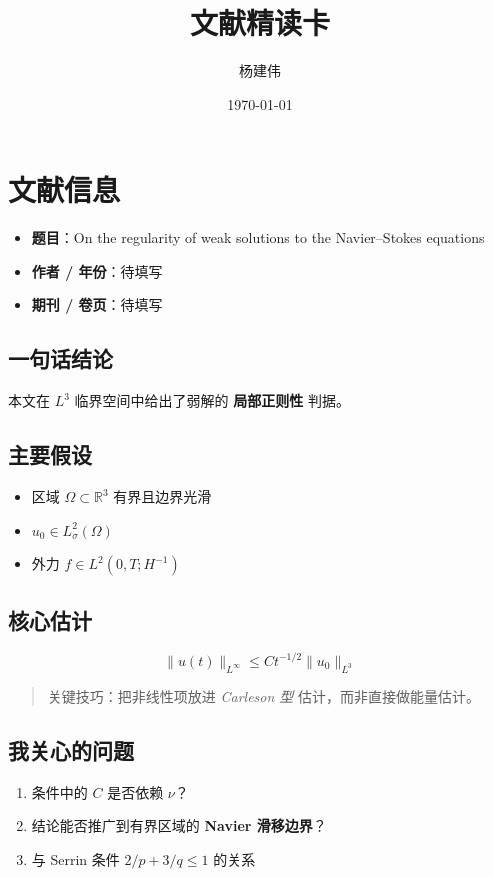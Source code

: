 \documentclass[UTF8,a4paper,11pt,fontset=fandol]{ctexart}
\title{文献精读卡}
\author{杨建伟}
\date{\today}
\begin{document}
\maketitle

\section{文献信息}

\begin{itemize}
  \item \textbf{题目}：On the regularity of weak solutions to the Navier--Stokes equations
  \item \textbf{作者 / 年份}：待填写
  \item \textbf{期刊 / 卷页}：待填写
\end{itemize}

\subsection{一句话结论}

本文在 $L^3$ 临界空间中给出了弱解的 \textbf{局部正则性} 判据。

\subsection{主要假设}

\begin{itemize}
  \item 区域 $\Omega \subset \mathbb{R}^3$ 有界且边界光滑
  \item $u_0 \in L^2_\sigma(\Omega)$
  \item 外力 $f \in L^2(0,T;H^{-1})$
\end{itemize}

\subsection{核心估计}

\[
\|u(t)\|_{L^\infty} \le C t^{-1/2} \|u_0\|_{L^3}
\]

\begin{quote}
关键技巧：把非线性项放进 \textit{Carleson 型} 估计，而非直接做能量估计。
\end{quote}

\subsection{我关心的问题}

\begin{enumerate}
  \item 条件中的 $C$ 是否依赖 $\nu$？
  \item 结论能否推广到有界区域的 \textbf{Navier 滑移边界}？
  \item 与 Serrin 条件 $2/p + 3/q \le 1$ 的关系
\end{enumerate}
\end{document}
